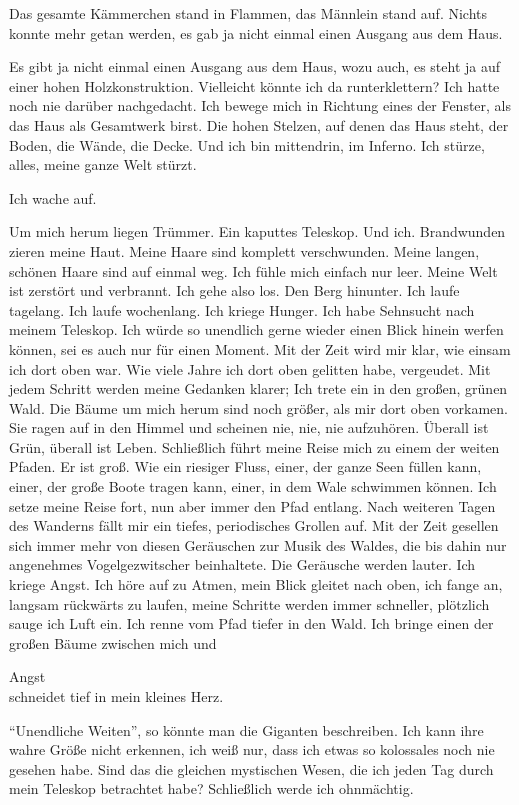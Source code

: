 \documentclass{article}
\begin{document}
	Das gesamte Kämmerchen stand in Flammen, das Männlein stand auf. Nichts konnte mehr getan werden, es gab ja nicht einmal einen Ausgang aus dem Haus.  
	
	Es gibt ja nicht einmal einen Ausgang aus dem Haus, wozu auch, es steht ja auf einer hohen Holzkonstruktion. Vielleicht könnte ich da runterklettern? Ich hatte noch nie darüber nachgedacht. Ich bewege mich in Richtung eines der Fenster, als das Haus als Gesamtwerk birst. Die hohen Stelzen, auf denen das Haus steht, der Boden, die Wände, die Decke. Und ich bin mittendrin, im Inferno. Ich stürze, alles, meine ganze Welt stürzt.
	
	Ich wache auf.  
	
	Um mich herum liegen Trümmer. Ein kaputtes Teleskop. Und ich. Brandwunden zieren meine Haut. Meine Haare sind komplett verschwunden. Meine langen, schönen Haare sind auf einmal weg. Ich fühle mich einfach nur leer. Meine Welt ist zerstört und verbrannt. Ich gehe also los. Den Berg hinunter. Ich laufe tagelang. Ich laufe wochenlang. Ich kriege Hunger. Ich habe Sehnsucht nach meinem Teleskop. Ich würde so unendlich gerne wieder einen Blick hinein werfen können, sei es auch nur für einen Moment. Mit der Zeit wird mir klar, wie einsam ich dort oben war. Wie viele Jahre ich dort oben gelitten habe, vergeudet. Mit jedem Schritt werden meine Gedanken klarer; Ich trete ein in den großen, grünen Wald. Die Bäume um mich herum sind noch größer, als mir dort oben vorkamen. Sie ragen auf in den Himmel und scheinen nie, nie, nie aufzuhören. Überall ist Grün, überall ist Leben. Schließlich führt meine Reise mich zu einem der weiten Pfaden. Er ist groß. Wie ein riesiger Fluss, einer, der ganze Seen füllen kann, einer, der große Boote tragen kann, einer, in dem Wale schwimmen können. Ich setze meine Reise fort, nun aber immer den Pfad entlang. Nach weiteren Tagen des Wanderns fällt mir ein tiefes, periodisches Grollen auf. Mit der Zeit gesellen sich immer mehr von diesen Geräuschen zur Musik des Waldes, die bis dahin nur angenehmes Vogelgezwitscher beinhaltete. Die Geräusche werden lauter. Ich kriege Angst. Ich höre auf zu Atmen, mein Blick gleitet nach oben, ich fange an, langsam rückwärts zu laufen, meine Schritte werden immer schneller, plötzlich sauge ich Luft ein. Ich renne vom Pfad tiefer in den Wald. Ich bringe einen der großen Bäume zwischen mich und  
	
	Angst  \\
	schneidet tief in mein kleines Herz.
	
	“Unendliche Weiten”, so könnte man die Giganten beschreiben. Ich kann ihre wahre Größe nicht erkennen, ich weiß nur, dass ich etwas so kolossales noch nie gesehen habe. Sind das die gleichen mystischen Wesen, die ich jeden Tag durch mein Teleskop betrachtet habe? Schließlich werde ich ohnmächtig.
	
\end{document}
